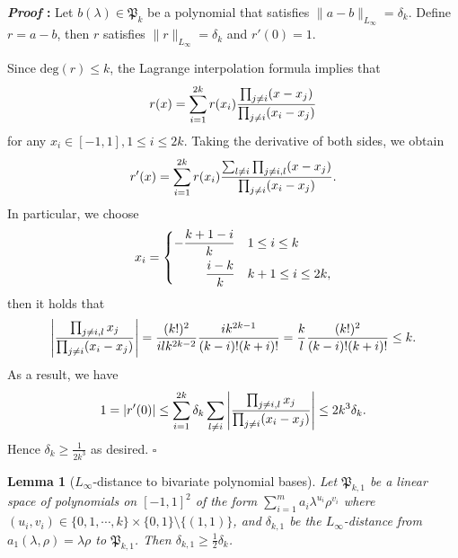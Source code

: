 \documentclass{article}
\newtheorem{lemma}{Lemma}[section]
\renewenvironment{proof}{\noindent\textbf{\textit{Proof }:}}{\hfill$\square$}
\begin{document}
\begin{proof}
    Let $b(\lambda)\in\mathfrak{P}_k$ be a polynomial that satisfies $\|a-b\|_{L_\infty}=\delta_k$. Define $r=a-b$, then $r$ satisfies $\|r\|_{L_\infty}=\delta_k$ and $r'(0)=1$.

    Since $\mathrm{deg}(r)\leq k$, the Lagrange interpolation formula implies that 
    \begin{equation}
        \notag
        r(x) = \sum_{i=1}^{2k} r(x_i)\frac{\prod_{j\neq i}(x-x_j)}{\prod_{j\neq i}(x_i-x_j)}
    \end{equation}
    for any $x_i\in[-1,1], 1\leq i\leq 2k$.
    Taking the derivative of both sides, we obtain
    \begin{equation}
        \notag
        r'(x) = \sum_{i=1}^{2k} r(x_i)\frac{\sum_{l\neq i}\prod_{j\neq i,l}(x-x_j)}{\prod_{j\neq i}(x_i-x_j)}.
    \end{equation}
    In particular, we choose 
    \begin{equation}
        \notag
        x_i = \left\{
        \begin{aligned}
             -\frac{k+1-i}{k} \quad & 1\leq i\leq k \\
            \frac{i-k}{k} \quad & k+1\leq i\leq 2k,
        \end{aligned}
        \right.
    \end{equation}
    then it holds that
    \begin{equation}
        \notag
        \left|\frac{\prod_{j\neq i,l}x_j}{\prod_{j\neq i}(x_i-x_j)}\right| = \frac{(k!)^2}{ilk^{2k-2}}\frac{ik^{2k-1}}{(k-i)!(k+i)!} = \frac{k}{l}\frac{(k!)^2}{(k-i)!(k+i)!}\leq k.
    \end{equation}
    As a result, we have
    \begin{equation}
        \notag
        1=\left|r'(0)\right|\leq\sum_{i=1}^{2k}\delta_k\sum_{l\neq i}\left|\frac{\prod_{j\neq i,l}x_j}{\prod_{j\neq i}(x_i-x_j)}\right|\leq 2k^3\delta_k.
    \end{equation}
    Hence $\delta_k\geq \frac{1}{2k^3}$ as desired.
\end{proof}

\begin{lemma}[$L_{\infty}$-distance to bivariate polynomial bases]
    \label{lemma:two-variable-polynomial-distance}
    Let $\mathfrak{P}_{k,1}$ be a linear space of polynomials on $[-1,1]^2$ of the form $\sum_{i=1}^m a_i\lambda^{u_i}\rho^{v_i}$ where $(u_i,v_i)\in\{0,1,\cdots,k\}\times\{0,1\}\setminus\{(1,1)\}$, and $\delta_{k,1}$ be the $L_{\infty}$-distance from $a_1(\lambda,\rho)=\lambda\rho$ to $\mathfrak{P}_{k,1}$. Then $\delta_{k,1}\geq\frac{1}{2}\delta_k$.
\end{lemma}
\end{document}
